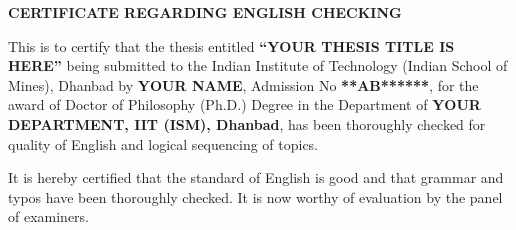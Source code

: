 \newpage

\setlength{\headheight}{5cm} %
\renewcommand{\headrulewidth}{0pt} %


\fancyhead[L]{} %
\fancyhead[C]{} %

\vspace{2cm} %

\begin{center}
    {\textbf{\color{red}\large CERTIFICATE REGARDING ENGLISH CHECKING}}
\end{center}

\vspace{0.3cm}

\noindent
\justifying
This is to certify that the thesis entitled \textbf{“YOUR THESIS TITLE IS HERE”} being submitted to the Indian Institute of Technology (Indian School of Mines), Dhanbad by \textbf{YOUR NAME}, Admission No \textbf{**AB******}, for the award of Doctor of Philosophy (Ph.D.) Degree in the Department of \textbf{YOUR DEPARTMENT, IIT (ISM), Dhanbad}, has been thoroughly checked for quality of English and logical sequencing of topics.\par


\noindent It is hereby certified that the standard of English is good and that grammar and typos have been thoroughly checked. It is now worthy of evaluation by the panel of examiners.


